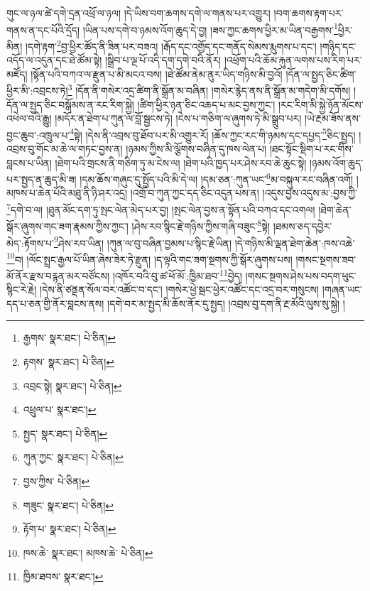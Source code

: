 གུང་ལ་ཉལ་ཚེ་དགེ་དྲན་འཕྲོ་ལ་ཉལ། །དེ་ཡིས་བག་ཆགས་དགེ་ལ་གནས་པར་འགྱུར། །བག་ཆགས་རྟག་པར་གནས་ན་དང་པོའི་དྲོད། །ཡིན་པས་དགེ་བ་ཉམས་འོག་ཆུད་དེ་བྱ། །ཟས་ཀྱང་ཆགས་ཕྱིར་མ་ཡིན་བརྒྱགས་\footnote{རྒྱགས་  སྣར་ཐང་།  པེ་ཅིན། }ཕྱིར་མིན། །དགེ་རྟག་\footnote{རྟགས་  སྣར་ཐང་།  པེ་ཅིན། }བྱ་ཕྱིར་ཚོད་ནི་ཟིན་པར་བཟའ། །རྒོད་དང་འགྱོད་དང་གནོད་སེམས་རྨུགས་པ་དང་། །གཉིད་དང་འདོད་ལ་འདུན་དང་ཐེ་ཚོམ་སྟེ། །སྒྲིབ་པ་ལྔ་པོ་འདི་དག་དགེ་བའི་ནོར། །འཕྲོག་པའི་ཆོམ་རྐུན་ལགས་པས་རིག་པར་མཛོད། །སྟོན་པའི་བཀའ་ལ་རྫུན་པ་མི་མངའ་བས། །ཐེ་ཚོམ་ནེམ་ནུར་ཡིད་གཉིས་མི་བྱའོ། །དོན་ལ་སྤྱད་ཅིང་ཚིག་ཕྱིར་མི་:འབྲངས་ཏེ།\footnote{འབྲང་སྟེ།  སྣར་ཐང་།  པེ་ཅིན། } །དོན་ནི་གསེར་འདྲ་ཚིག་ནི་སྒྲོན་མ་བཞིན། །གསེར་རྙེད་ནས་ནི་སྒྲོན་མ་གདེག་མི་དགོས། །དོན་ལ་སྤྱད་ཅིང་བསྒོམས་ན་རང་རིག་སྐྱེ། །ཚིག་ཕྱིར་ཉན་ཅིང་འཆད་པ་མང་བྱས་ཀྱང་། །རང་རིག་མི་སྐྱེ་ཉོན་མོངས་འཕེལ་བའི་རྒྱུ། །མདོར་ན་ཐེག་པ་ཀུན་ལ་བློ་སྦྱངས་ཏེ། །ངེས་པ་གཅིག་ལ་ཞུགས་ཏེ་མི་སྒྲུབ་པར། །ཡེ་རྔམ་ཟོས་ནས་བྱང་ཆུབ་:འཁྲུལ་པ་\footnote{འཕྲུལ་པ་  སྣར་ཐང་། }སྟེ། །དེས་ནི་འབྲས་བུ་ཐོབ་པར་མི་འགྱུར་རོ། །ཆོས་ཀྱང་རང་གི་ཉམས་དང་དཔྱད་\footnote{སྤྱད་  སྣར་ཐང་།  པེ་ཅིན། }ཅིང་སྤྱད། །འབྲས་བུ་གོང་མ་ཆེ་ལ་གཏང་བྱས་ན། །ཉམས་ཀྱིས་མི་ལྕོགས་བཞིན་དུ་ཁས་ལེན་པ། །ཐང་སྟོང་སྡིག་པ་རང་གིས་བླངས་པ་ཡིན། །ཐེག་པའི་གྲངས་ནི་གཅིག་ཏུ་མ་ངེས་ལ། །ཐེག་པའི་ཁྱད་པར་ཤེས་རབ་ཆེ་ཆུང་སྟེ། །ཉམས་འོག་ཆུད་པར་སྤྱད་ན་ཆུད་མི་ཟ། །དམ་ཆོས་གཞུང་དུ་སྤྱོད་པའི་མི་དེ་ལ། །དམ་ཅན་:ཀུན་ཡང་\footnote{ཀུན་ཀྱང་  སྣར་ཐང་།  པེ་ཅིན། }མ་བསྐུལ་རང་བཞིན་འགོ། །མཁས་པ་ཆེན་པོའི་མཐུ་ནི་ཉི་ཤར་འདྲ། །འགྲོ་བ་ཀུན་ཀྱང་དད་ཅིང་འདུན་པས་ན། །འདུས་བྱས་འདུས་མ་:བྱས་ཀྱི་\footnote{བྱས་ཀྱིས་  པེ་ཅིན། }དགེ་བ་ལ། །ཐུན་མོང་དག་ཏུ་སྤང་ལེན་མེད་པར་བྱ། །སྤང་ལེན་བྱས་ན་སྟོན་པའི་བཀའ་དང་འགལ། །ཐེག་ཆེན་སྒོར་ཞུགས་གང་ཟག་རྣམས་ཀྱིས་ཀྱང་། །ཤེས་རབ་སྙིང་རྗེ་གཉིས་ཀྱིས་གཞི་བཟུང་\footnote{གཟུང་  སྣར་ཐང་།  པེ་ཅིན། }སྟེ། །ཐམས་ཅད་དབྱེར་མེད་:རྟོགས་པ་\footnote{རྟོག་པ་  སྣར་ཐང་།  པེ་ཅིན། }ཤེས་རབ་ཡིན། །ཀུན་ལ་བུ་བཞིན་བྱམས་པ་སྙིང་རྗེ་ཡིན། །དེ་གཉིས་མི་ལྡན་ཐེག་ཆེན་:ཁས་འཆེ་\footnote{ཁས་ཆེ་  སྣར་ཐང་། མཁས་ཆེ་  པེ་ཅིན། }བ། །ལོང་སྤྲང་རྒྱལ་པོ་ཡིན་ཞེས་ཟེར་ཏེ་རྫུན། །ད་ལྟའི་གང་ཟག་སྔགས་ཀྱི་སྒོར་ཞུགས་པས། །གསང་སྔགས་ཟབ་མོ་ནོར་རྫས་བརྙན་མར་བཙོངས། །འཁོར་བའི་བུ་ཚ་ཕོ་མོ་:ཁྱིམ་ཐབ་\footnote{ཁྱིམ་ཐབས་  སྣར་ཐང་། }བྱེད། །གསང་སྔགས་ཤེས་པས་བདག་ཕུང་སྙིང་རེ་རྗེ། །དེས་ནི་ཙནྡན་སོལ་བར་འཚོང་བ་དང་། །གསེར་ཕྱེ་སྦང་ཕྱེར་འཚོང་དང་འདྲ་བར་གསུངས། །གཞན་ཡང་དད་པ་ཅན་གྱི་ནོར་བླངས་ནས། །དགེ་བར་མ་སྤྱད་མི་ཆོས་ནོར་དུ་སྤྱད། །འབྲས་བུ་དག་ནི་རྔ་མོའི་ལུས་སུ་སྐྱེ། །
